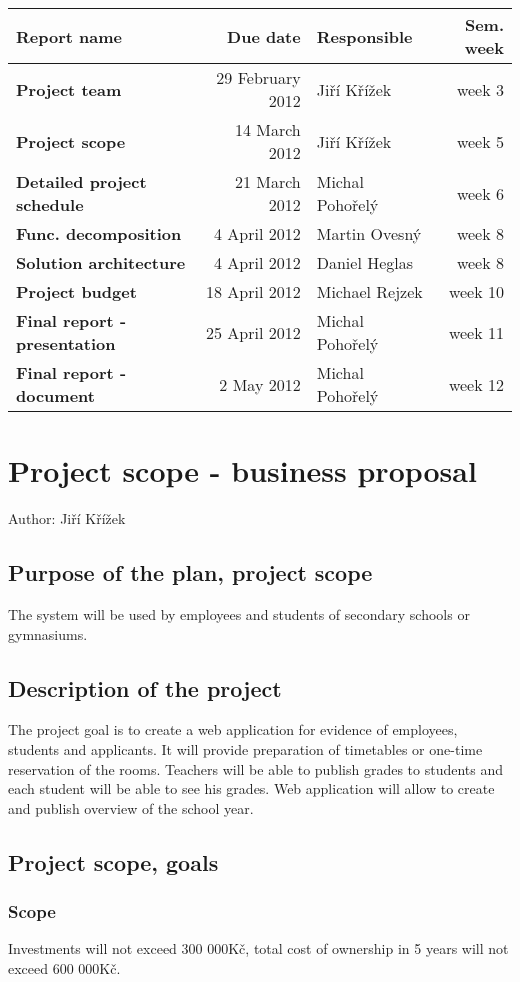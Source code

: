 \documentclass[12pt]{article}
\begin{document}
\begin{tabular}{|l|r|l|r|}
\hline
\bf{Report name} & \bf{Due date} & \bf{Responsible} & \bf{Sem. week} \\
\hline
\hline
{\bf Project team                } & 29 February 2012 & Jiří Křížek & week 3 \\
{\bf Project scope               } & 14 March 2012 & Jiří Křížek & week 5 \\
{\bf Detailed project schedule } & 21 March 2012 & Michal Pohořelý & week 6 \\
{\bf Func. decomposition } & 4 April 2012 & Martin Ovesný & week 8 \\
{\bf Solution architecture } & 4 April 2012 & Daniel Heglas & week 8 \\
{\bf Project budget } & 18 April 2012 & Michael Rejzek & week 10 \\
{\bf Final report - presentation } & 25 April 2012 & Michal Pohořelý & week 11 \\
{\bf Final report - document     } & 2 May 2012 & Michal Pohořelý & week 12 \\
\hline
\end{tabular}
\newpage
\section{Project scope - business proposal}
Author: Jiří Křížek
\subsection{Purpose of the plan, project scope}
The system will be used by employees and students of secondary schools or gymnasiums.
\subsection{Description of the project}
The project goal is to create a web application for evidence of employees, students and applicants. It will provide preparation of timetables or one-time reservation of the rooms. Teachers will be able to publish grades to students and each student will be able to see his grades. Web application will allow to create and publish overview of the school year.
\subsection{Project scope, goals}

\subsubsection{Scope}
Investments will not exceed 300 000Kč, total cost of ownership in 5 years will not exceed 600 000Kč.
\end{document}
